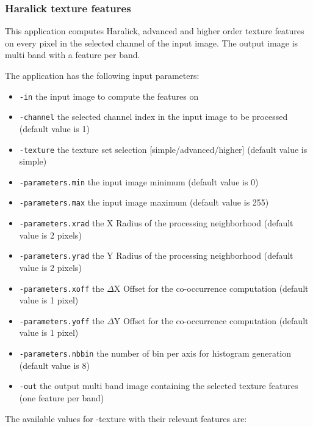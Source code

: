 \subsubsection{Haralick texture features}

This application computes Haralick, advanced and higher order texture features on
every pixel in the selected channel of the input image. The output image is multi
band with a feature per band.

The  application has the following input parameters:
\begin{itemize}
\item \verb?-in? the input image to compute the features on
\item \verb?-channel? the selected channel index in the input image to be processed (default value is 1)
\item \verb?-texture? the texture set selection [simple/advanced/higher] (default value is simple)
\item \verb?-parameters.min? the input image minimum (default value is 0) 
\item \verb?-parameters.max? the input image maximum (default value is 255)
\item \verb?-parameters.xrad? the X Radius of the processing neighborhood (default value is 2 pixels)
\item \verb?-parameters.yrad? the Y Radius of the processing neighborhood (default value is 2 pixels)
\item \verb?-parameters.xoff? the $\Delta$X Offset for the co-occurrence computation (default value is 1 pixel)
\item \verb?-parameters.yoff? the $\Delta$Y Offset for the co-occurrence computation (default value is 1 pixel)
\item \verb?-parameters.nbbin? the number of bin per axis for histogram generation (default value is 8)
\item \verb?-out? the output multi band image containing the selected texture features (one feature per band)
\end{itemize}


The available values for -texture with their relevant features are:

